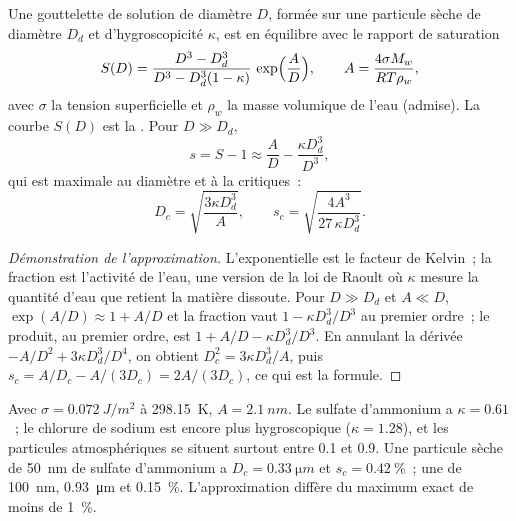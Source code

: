 \begin{proposition}\label{prop:b2:atmospheric-thermodynamics:kohler}
Une gouttelette de solution de diamètre $D$, formée sur une particule sèche de diamètre
$D_d$ et d'hygroscopicité $\kappa$, est en équilibre avec le rapport de saturation
\[
  S(D) = \frac{D^3 - D_d^3}{D^3 - D_d^3(1 - \kappa)}\,\exp\Bigl(\frac{A}{D}\Bigr), \qquad
  A = \frac{4\sigma M_w}{R T\rho_w},
\]
avec $\sigma$ la tension superficielle et $\rho_w$ la masse volumique de l'eau
(admise). La courbe $S(D)$ est la \emph{}. Pour $D \gg D_d$,
\[
  s = S - 1 \approx \frac{A}{D} - \frac{\kappa D_d^3}{D^3},
\]
qui est maximale au diamètre et à la  critiques~:
\[
  D_c = \sqrt{\frac{3\kappa D_d^3}{A}}, \qquad s_c = \sqrt{\frac{4A^3}{27\,\kappa D_d^3}} .
\]
\end{proposition}

\begin{proof}[Démonstration de l'approximation]
L'exponentielle est le facteur de Kelvin~; la fraction est l'activité de l'eau, une version de
la loi de Raoult où $\kappa$ mesure la quantité d'eau que retient la matière dissoute. Pour
$D \gg D_d$ et $A \ll D$, $\exp(A/D) \approx 1 + A/D$ et la fraction vaut $1 - \kappa D_d^3/D^3$ au
premier ordre~; le produit, au premier ordre, est $1 + A/D - \kappa D_d^3/D^3$. En annulant la
dérivée $-A/D^2 + 3\kappa D_d^3/D^4$, on obtient $D_c^2 = 3\kappa D_d^3/A$, puis $s_c = A/D_c -
A/(3D_c) = 2A/(3D_c)$, ce qui est la formule.
\end{proof}

Avec $\sigma = \qty{0.072}{J/m^2}$ à \qty{298.15}{K}, $A = \qty{2.1}{nm}$. Le sulfate d'ammonium a $\kappa = 0.61$~; le
chlorure de sodium est encore plus hygroscopique ($\kappa = 1.28$), et les particules atmosphériques se situent surtout
entre 0.1 et 0.9. Une particule sèche de \qty{50}{nm} de sulfate d'ammonium a $D_c = \qty{0.33}{\micro m}$ et $s_c =
\qty{0.42}{\percent}$~; une de \qty{100}{nm}, \qty{0.93}{\micro m} et \qty{0.15}{\percent}.
L'approximation diffère du maximum exact de moins de \qty{1}{\percent}.

